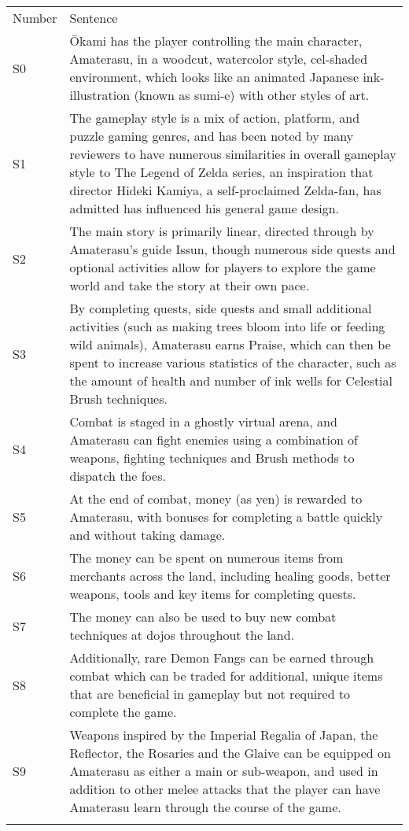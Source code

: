 \begin{tabular}{p{}p{}}

\noalign{\smallskip}\hline\noalign{\smallskip}
Number & Sentence  \\
\noalign{\smallskip}\hline\noalign{\smallskip}

S0 & 
Ōkami has the player controlling the main character, Amaterasu, in a woodcut, watercolor style, cel-shaded environment, which looks like an animated Japanese ink-illustration (known as sumi-e) with other styles of art. 
\\

S1 & 
The gameplay style is a mix of action, platform, and puzzle gaming genres, and has been noted by many reviewers to have numerous similarities in overall gameplay style to The Legend of Zelda series, an inspiration that director Hideki Kamiya, a self-proclaimed Zelda-fan, has admitted has influenced his general game design. 
\\

S2 & 
The main story is primarily linear, directed through by Amaterasu's guide Issun, though numerous side quests and optional activities allow for players to explore the game world and take the story at their own pace.
\\

S3 & 
By completing quests, side quests and small additional activities (such as making trees bloom into life or feeding wild animals), Amaterasu earns Praise, which can then be spent to increase various statistics of the character, such as the amount of health and number of ink wells for Celestial Brush techniques. 
\\

S4 & 
Combat is staged in a ghostly virtual arena, and Amaterasu can fight enemies using a combination of weapons, fighting techniques and Brush methods to dispatch the foes.
\\

S5 & 
At the end of combat, money (as yen) is rewarded to Amaterasu, with bonuses for completing a battle quickly and without taking damage. 
\\

S6 & 
The money can be spent on numerous items from merchants across the land, including healing goods, better weapons, tools and key items for completing quests.
\\

S7 & 
The money can also be used to buy new combat techniques at dojos throughout the land. 
\\

S8 & 
Additionally, rare Demon Fangs can be earned through combat which can be traded for additional, unique items that are beneficial in gameplay but not required to complete the game.
\\

S9 & 
Weapons inspired by the Imperial Regalia of Japan, the Reflector, the Rosaries and the Glaive can be equipped on Amaterasu as either a main or sub-weapon, and used in addition to other melee attacks that the player can have Amaterasu learn through the course of the game. 
\\

\noalign{\smallskip}\hline
\end{tabular} 
